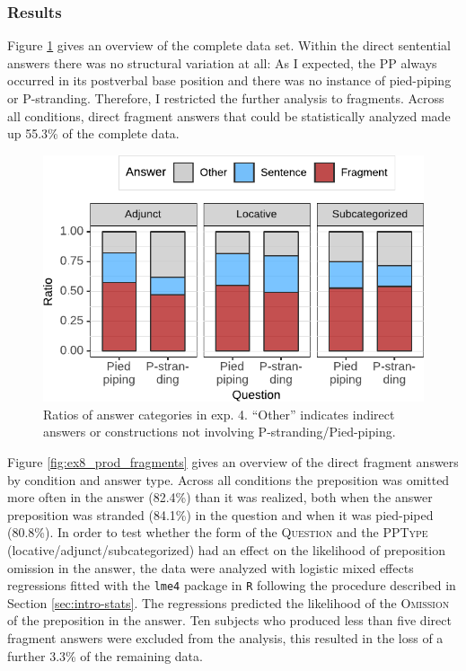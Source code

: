 \subsubsection{Results}
Figure \ref{fig:ex8_prod_relfrag} gives an overview of the complete data set. Within the direct sentential answers there was no structural variation at all: As I expected, the PP always occurred in its postverbal base position and there was no instance of pied-piping or P-stranding. Therefore, I restricted the further analysis to fragments. Across all conditions, direct fragment answers that could be statistically analyzed made up 55.3\% of the complete data.

\begin{figure}
\includegraphics[scale=1]{figures/ex8_prod_answers}
 \caption{Ratios of answer categories in exp. 4. ``Other'' indicates indirect answers or constructions not involving P-stranding/Pied-piping\label{fig:ex8_prod_relfrag}.}
\end{figure}

Figure \ref{fig:ex8_prod_fragments} gives an overview of the direct fragment answers by condition and answer type. Across all conditions the preposition was omitted more often in the answer (82.4\%) than it was realized, both when the answer preposition was stranded (84.1\%) in the question and when it was pied-piped (80.8\%). In order to test whether the form of the \textsc{Question} and the \textsc{PPType} (locative\slash adjunct\slash subcategorized) had an effect on the likelihood of preposition omission in the answer, the data were analyzed with logistic mixed effects regressions fitted with the \texttt{lme4} \citep{bates.etal2015} package in \texttt{R} following the procedure described in Section \ref{sec:intro-stats}. The regressions predicted the likelihood of the \textsc{Omission} of the preposition in the answer. Ten subjects who produced less than five direct fragment answers were excluded from the analysis, this resulted in the loss of a further 3.3\% of the remaining data.

